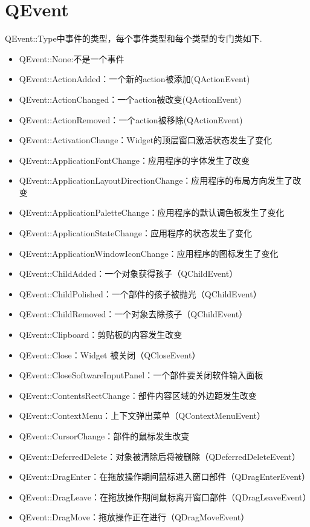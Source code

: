 \chapter{QEvent}
QEvent::Type中事件的类型，每个事件类型和每个类型的专门类如下.
\begin{itemize}
\item{QEvent::None:不是一个事件}
\item{QEvent::ActionAdded：一个新的action被添加(QActionEvent)}
\item{QEvent::ActionChanged：一个action被改变(QActionEvent)}
\item{QEvent::ActionRemoved：一个action被移除(QActionEvent)}
\item{QEvent::ActivationChange：Widget的顶层窗口激活状态发生了变化}
\item{QEvent::ApplicationFontChange：应用程序的字体发生了改变}
\item{QEvent::ApplicationLayoutDirectionChange：应用程序的布局方向发生了改变}
\item{QEvent::ApplicationPaletteChange：应用程序的默认调色板发生了变化}
\item{QEvent::ApplicationStateChange：应用程序的状态发生了变化}
\item{QEvent::ApplicationWindowIconChange：应用程序的图标发生了变化}
\item{QEvent::ChildAdded：一个对象获得孩子（QChildEvent）}
\item{QEvent::ChildPolished：一个部件的孩子被抛光（QChildEvent）}
\item{QEvent::ChildRemoved：一个对象去除孩子（QChildEvent）}
\item{QEvent::Clipboard：剪贴板的内容发生改变}
\item{QEvent::Close：Widget 被关闭（QCloseEvent）}
\item{QEvent::CloseSoftwareInputPanel：一个部件要关闭软件输入面板}
\item{QEvent::ContentsRectChange：部件内容区域的外边距发生改变}
\item{QEvent::ContextMenu：上下文弹出菜单（QContextMenuEvent）}
\item{QEvent::CursorChange：部件的鼠标发生改变}
\item{QEvent::DeferredDelete：对象被清除后将被删除（QDeferredDeleteEvent）}
\item{QEvent::DragEnter：在拖放操作期间鼠标进入窗口部件（QDragEnterEvent）}
\item{QEvent::DragLeave：在拖放操作期间鼠标离开窗口部件（QDragLeaveEvent）}
\item{QEvent::DragMove：拖放操作正在进行（QDragMoveEvent）}

\end{itemize}
